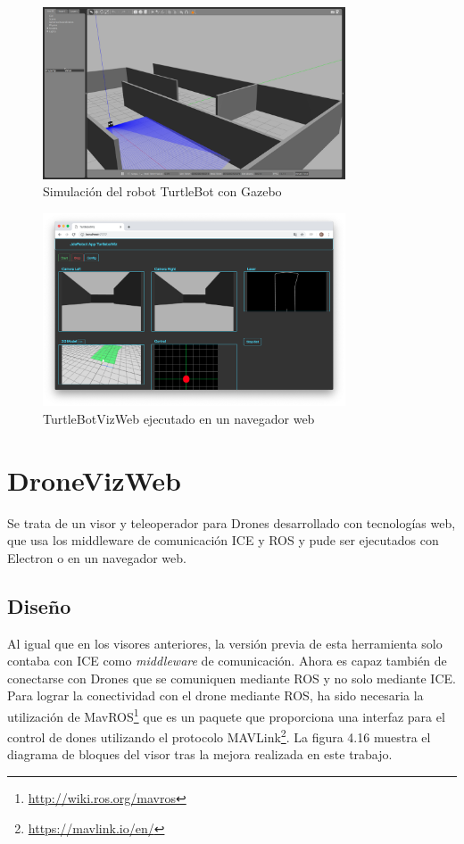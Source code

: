 \begin{figure}[H]
  \begin{center}
    \includegraphics[width=0.8\textwidth]{figures/gazeboturtle.png}
    		\caption{Simulación del robot TurtleBot con Gazebo}
		\label{fig.gazeboturtle}
		\end{center}
\end{figure}
\begin{figure}[H]
  \begin{center}
    \includegraphics[width=0.8\textwidth]{figures/TurtleBotviznode.png}
    		\caption{TurtleBotVizWeb ejecutado en un navegador web}
		\label{fig.TurtleBotviznode}
		\end{center}
\end{figure}

\section{DroneVizWeb}
Se trata de un visor y teleoperador para Drones desarrollado con tecnologías web, que usa los middleware de comunicación ICE y ROS y pude ser ejecutados con Electron o en un navegador web.

\subsection{Diseño}
Al igual que en los visores anteriores, la versión previa de esta herramienta solo contaba con ICE como \textit{middleware} de comunicación. Ahora es capaz también de conectarse con Drones que se comuniquen mediante ROS y no solo mediante ICE. Para lograr la conectividad con el drone mediante ROS, ha sido necesaria la utilización de MavROS\footnote{\url{http://wiki.ros.org/mavros}} que es un paquete que proporciona una interfaz para el control de dones utilizando el protocolo MAVLink\footnote{\url{https://mavlink.io/en/}}. La figura 4.16 muestra el diagrama de bloques del visor tras la mejora realizada en este trabajo.

